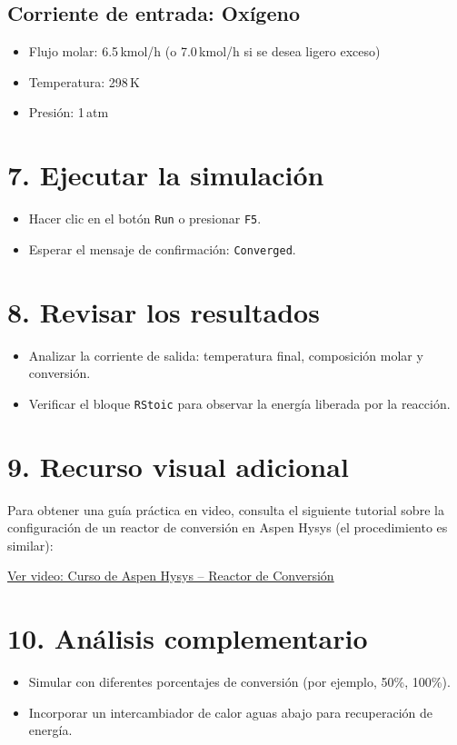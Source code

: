 \documentclass[12pt]{article}
\begin{document}
\subsection*{Corriente de entrada: Oxígeno}
\begin{itemize}
  \item Flujo molar: 6.5 kmol/h (o 7.0 kmol/h si se desea ligero exceso)
  \item Temperatura: 298 K
  \item Presión: 1 atm
\end{itemize}

\section*{7. Ejecutar la simulación}
\begin{itemize}
  \item Hacer clic en el botón \texttt{Run} o presionar \texttt{F5}.
  \item Esperar el mensaje de confirmación: \texttt{Converged}.
\end{itemize}

\section*{8. Revisar los resultados}
\begin{itemize}
  \item Analizar la corriente de salida: temperatura final, composición molar y conversión.
  \item Verificar el bloque \texttt{RStoic} para observar la energía liberada por la reacción.
\end{itemize}

\section*{9. Recurso visual adicional}
Para obtener una guía práctica en video, consulta el siguiente tutorial sobre la configuración de un reactor de conversión en Aspen Hysys (el procedimiento es similar):

\begin{center}
\href{https://youtu.be/5GNP5KDei7A}{Ver video: Curso de Aspen Hysys – Reactor de Conversión}
\end{center}

\section*{10. Análisis complementario}
\begin{itemize}
  \item Simular con diferentes porcentajes de conversión (por ejemplo, 50\%, 100\%).
  \item Incorporar un intercambiador de calor aguas abajo para recuperación de energía.
\end{itemize}
\end{document}
